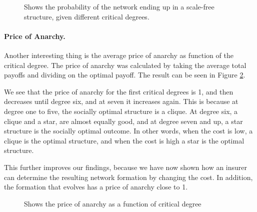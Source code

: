 \begin{figure}
\centering
{}
\caption{\label{fig:PlotStarIsj} Shows the probability of the network ending up in a scale-free structure, given different critical degrees.}
\end{figure}
\paragraph{Price of Anarchy.}
Another interesting thing is the average price of anarchy as function of the critical degree. The price of anarchy was calculated by taking the average total payoffs and dividing on the optimal payoff. The result can be seen in Figure \ref{fig:plotpriceofanarchy}. 

We see that the price of anarchy for the first critical degrees is 1, and then decreases until degree six, and at seven it increases again. This is because at degree one to five, the socially optimal structure is a clique. At degree six, a clique and a star, are almost equally good, and at degree seven and up, a star structure is the socially optimal outcome. 
In other words, when the cost is low, a clique is the optimal structure, and when the cost is high a star is the optimal structure. 

This further improves our findings, because we have now shown how an insurer can determine the resulting network formation by changing the cost. In addition, the formation that evolves has a price of anarchy close to 1. 

\begin{figure}
\centering
{}
\caption{\label{fig:plotpriceofanarchy} Shows the price of anarchy as a function of critical degree}
\end{figure}




